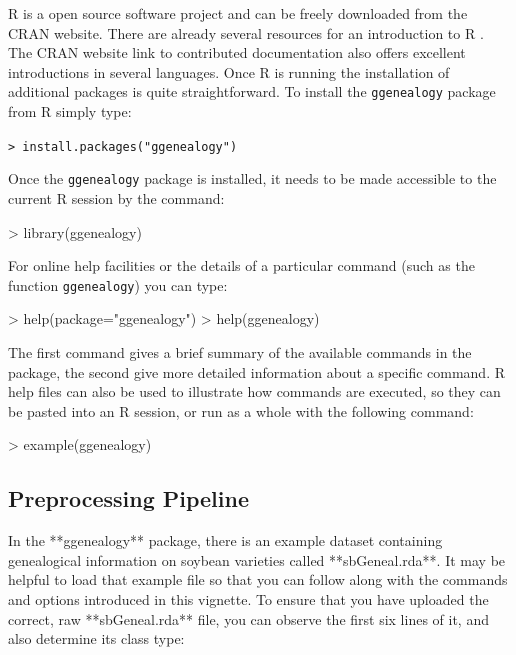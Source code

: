 \documentclass{article}
\numberwithin{equation}{section} %
\newcommand{\pkg}[1]{{\texttt{#1}}}
\newcommand{\R}{{\normalfont\textsf{R }}{}}
\begin{document}
\R is a open source software project and can be freely downloaded from
the CRAN website. There are already several resources for an
introduction to \R.  The CRAN website link to contributed
documentation also offers excellent introductions in several
languages. Once \R is running the installation of additional packages
is quite straightforward.  To install the \pkg{ggenealogy} package from \R
simply type:

\vspace{2mm}
\noindent
\texttt{> install.packages("ggenealogy")}

\vspace{2mm}
\noindent
Once the \texttt{ggenealogy} package is installed, it needs to be made
accessible to the current \R session by the command:
\begin{Schunk}
\begin{Sinput}
> library(ggenealogy)
\end{Sinput}
\end{Schunk}

For online help facilities or the details of a particular command
(such as the function \texttt{ggenealogy}) you can type:
\begin{Schunk}
\begin{Sinput}
> help(package="ggenealogy")
> help(ggenealogy)
\end{Sinput}
\end{Schunk}

The first command gives a brief summary of the available commands in
the package, the second give more detailed information about a
specific command. \R help files can also be used to illustrate how commands
are executed, so they can be pasted into an \R session, or run as a whole with
the following command:

\begin{Schunk}
\begin{Sinput}
> example(ggenealogy)
\end{Sinput}
\end{Schunk}

\subsection{Preprocessing Pipeline}

In the **ggenealogy** package, there is an example dataset containing genealogical information on soybean varieties called **sbGeneal.rda**. It may be helpful to load that example file so that you can follow along with the commands and options introduced in this vignette. To ensure that you have uploaded the correct, raw **sbGeneal.rda** file, you can observe the first six lines of it, and also determine its class type:
\end{document}
